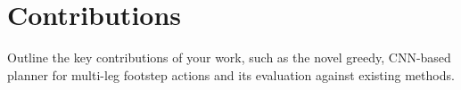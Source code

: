 \section{Contributions}

\begin{outline}
  Outline the key contributions of your work, such as the novel greedy, CNN-based planner for multi-leg footstep actions and its evaluation against existing methods.
\end{outline}
